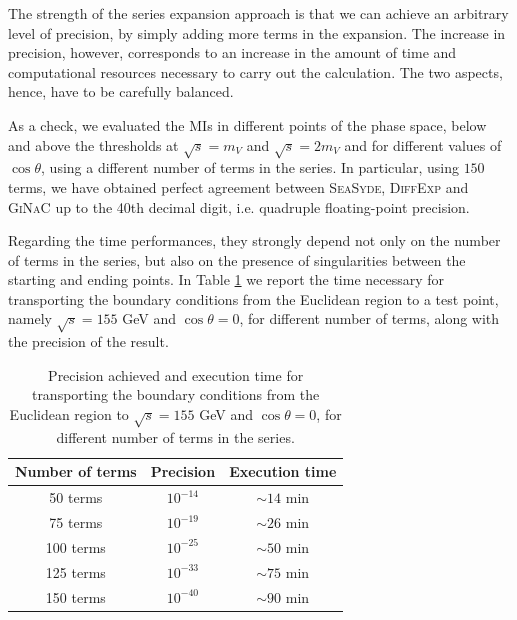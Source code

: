 \documentclass[final,1p,times]{elsarticle}
\begin{document}
The strength of the series expansion approach is that we can achieve an arbitrary level of precision, by simply adding more terms in the expansion. The increase in precision, however, corresponds to an increase in the amount of time and computational resources necessary to carry out the calculation. The two aspects, hence, have to be carefully balanced.

As a check, we evaluated the MIs in different points of the phase space, below and above the thresholds at $\sqrt{s}=m_V$ and $\sqrt{s}=2 m_V$ and for different values of $\cos\theta$, using a different number of terms in the series. In particular, using $150$ terms, we have obtained perfect agreement between \textsc{SeaSyde}, \textsc{DiffExp} and \textsc{GiNaC} up to the 40th decimal digit, i.e. quadruple floating-point precision. 

Regarding the time performances, they strongly depend not only on the number of terms in the series, but also on the presence of singularities between the starting and ending points. In Table \ref{table:checks} we report the time necessary for transporting the boundary conditions from the Euclidean region to a test point, namely $\sqrt{s}=155$ GeV and $\cos\theta=0$, for different number of terms, along with the precision of the result.

\begin{table}[ht!]
    \centering
    \begin{tabular}{c c c}
    \toprule
    Number of terms & Precision & Execution time\\
    \toprule
    50 terms & $10^{-14}$ & $\sim 14$ min\\
    \midrule
    75 terms & $10^{-19}$ & $\sim 26$ min\\
    \midrule
    100 terms & $10^{-25}$ & $\sim 50$ min\\
    \midrule
    125 terms & $10^{-33}$ & $\sim 75$ min\\
    \midrule
    150 terms & $10^{-40}$ & $\sim 90$ min\\
    \toprule
    \end{tabular}
    \caption{Precision achieved and execution time for transporting the boundary conditions from the Euclidean region to $\sqrt{s}=155$ GeV and $\cos\theta=0$, for different number of terms in the series.}
    \label{table:checks}
\end{table}
\end{document}
